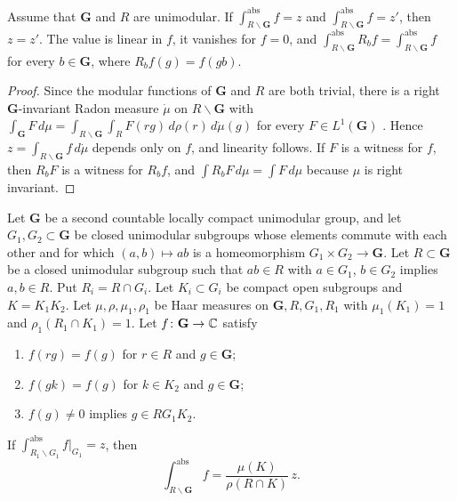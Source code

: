 \begin{lemma}[uniqueness]\label{w3s:lem:uniq}
Assume that $\mathbf G$ and $R$ are unimodular. If $\int^{\mathrm{abs}}_{R\backslash\mathbf G}f=z$ and $\int^{\mathrm{abs}}_{R\backslash\mathbf G}f=z'$, then $z=z'$. The value is linear in $f$, it vanishes for $f=0$, and $\int^{\mathrm{abs}}_{R\backslash\mathbf G}R_bf=\int^{\mathrm{abs}}_{R\backslash\mathbf G}f$ for every $b\in\mathbf G$, where $R_bf(g)=f(gb)$.
\end{lemma}

\begin{proof}
Since the modular functions of $\mathbf G$ and $R$ are both trivial, there is a right $\mathbf G$-invariant Radon measure $\dot\mu$ on $R\backslash\mathbf G$ with $\int_{\mathbf G}F\,d\mu=\int_{R\backslash\mathbf G}\int_RF(rg)\,d\rho(r)\,d\dot\mu(g)$ for every $F\in L^1(\mathbf G)$ \cite[\S2.6]{w2folland}. Hence $z=\int_{R\backslash\mathbf G}f\,d\dot\mu$ depends only on $f$, and linearity follows. If $F$ is a witness for $f$, then $R_bF$ is a witness for $R_bf$, and $\int R_bF\,d\mu=\int F\,d\mu$ because $\mu$ is right invariant.
\end{proof}

\begin{lemma}\label{w3s:lem:collapse}
Let $\mathbf G$ be a second countable locally compact unimodular group, and let $G_1,G_2\subset\mathbf G$ be closed unimodular subgroups whose elements commute with each other and for which $(a,b)\mapsto ab$ is a homeomorphism $G_1\times G_2\to\mathbf G$. Let $R\subset\mathbf G$ be a closed unimodular subgroup such that $ab\in R$ with $a\in G_1$, $b\in G_2$ implies $a,b\in R$. Put $R_i=R\cap G_i$. Let $K_i\subset G_i$ be compact open subgroups and $K=K_1K_2$. Let $\mu,\rho,\mu_1,\rho_1$ be Haar measures on $\mathbf G,R,G_1,R_1$ with $\mu_1(K_1)=1$ and $\rho_1(R_1\cap K_1)=1$. Let $f\colon\mathbf G\to\mathbb C$ satisfy
\begin{enumerate}[label=(\roman*),leftmargin=*]
\item $f(rg)=f(g)$ for $r\in R$ and $g\in\mathbf G$;
\item $f(gk)=f(g)$ for $k\in K_2$ and $g\in\mathbf G$;
\item $f(g)\ne0$ implies $g\in RG_1K_2$.
\end{enumerate}
If $\int^{\mathrm{abs}}_{R_1\backslash G_1}f|_{G_1}=z$, then
\[
\int^{\mathrm{abs}}_{R\backslash\mathbf G}f=\frac{\mu(K)}{\rho(R\cap K)}\,z .
\]
\end{lemma}

